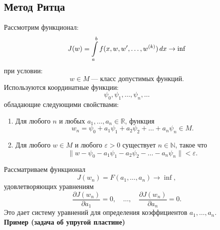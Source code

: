 \subsection{Метод Ритца}
Рассмотрим функционал:
\[
J(w) = \int\limits_{a}^{b} f(x, w, w', \ldots, w^{(k)}) \, dx \rightarrow \inf
\]
при условии:
\[
w \in M \ \text{--- класс допустимых функций}.
\]
Используются координатные функции:
\[
\psi_0, \psi_1, \ldots, \psi_n, \ldots
\]
обладающие следующими свойствами:
\begin{enumerate}
	\item Для любого \( n \) и любых \( a_1, \ldots, a_n \in \mathbb{R} \), функция
	\[
	w_n = \psi_0 + a_1 \psi_1 + a_2 \psi_2 + \ldots + a_n \psi_n \in M.
	\]
	\item Для любого \( w \in M \) и любого \( \varepsilon > 0 \) существует \( n \in \mathbb{N} \), такое что
	\[
	\| w - \psi_0 - a_1 \psi_1 - a_2 \psi_2 - \ldots - a_n \psi_n \| < \varepsilon.
	\]
\end{enumerate}
Рассматриваем функционал
\[
J(w_n) = F(a_1, \ldots, a_n) \rightarrow \inf,
\]
удовлетворяющих уравнениям
\[
\frac{\partial J(w_n)}{\partial a_1} = 0, \quad \ldots, \quad \frac{\partial J(w_n)}{\partial a_n} = 0.
\tag{1.2}
\label{1.2}
\]
Это дает систему уравнений для определения коэффициентов \( a_1, \ldots, a_n \). \\

\textbf{Пример (задача об упругой пластине)}

